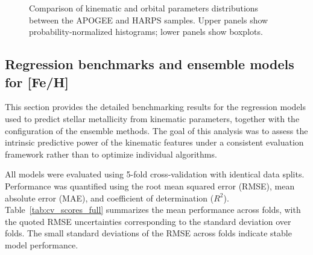 \documentclass{aa}
\begin{document}
\begin{appendix}
\begin{figure}
\caption{Comparison of kinematic and orbital parameters distributions between the APOGEE and HARPS samples. Upper panels show probability-normalized histograms; lower panels show boxplots.}
\label{fig:feature_distributions}
\end{figure}


\subsection{Regression benchmarks and ensemble models for [Fe/H]}

This section provides the detailed benchmarking results for the regression models used to predict stellar metallicity from kinematic parameters, together with the configuration of the ensemble methods. The goal of this analysis was to assess the intrinsic predictive power of the kinematic features under a consistent evaluation framework rather than to optimize individual algorithms.

All models were evaluated using 5-fold cross-validation with identical data splits. Performance was quantified using the root mean squared error (RMSE), mean absolute error (MAE), and coefficient of determination ($R^2$). Table~\ref{tab:cv_scores_full} summarizes the mean performance across folds, with the quoted RMSE uncertainties corresponding to the standard deviation over folds. The small standard deviations of the RMSE across folds indicate stable model performance.


\end{appendix}
\end{document}
